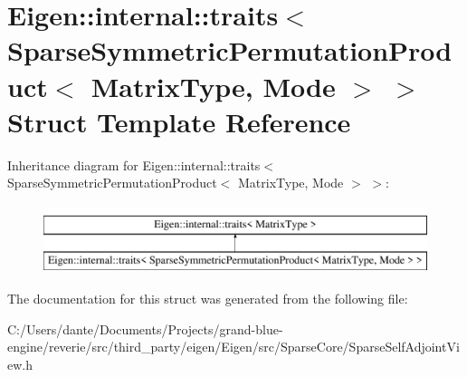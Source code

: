 \hypertarget{struct_eigen_1_1internal_1_1traits_3_01_sparse_symmetric_permutation_product_3_01_matrix_type_00_01_mode_01_4_01_4}{}\section{Eigen\+::internal\+::traits$<$ Sparse\+Symmetric\+Permutation\+Product$<$ Matrix\+Type, Mode $>$ $>$ Struct Template Reference}
\label{struct_eigen_1_1internal_1_1traits_3_01_sparse_symmetric_permutation_product_3_01_matrix_type_00_01_mode_01_4_01_4}
Inheritance diagram for Eigen\+::internal\+::traits$<$ Sparse\+Symmetric\+Permutation\+Product$<$ Matrix\+Type, Mode $>$ $>$\+:\begin{figure}[H]
\begin{center}
\leavevmode
\includegraphics[height=2.000000cm]{struct_eigen_1_1internal_1_1traits_3_01_sparse_symmetric_permutation_product_3_01_matrix_type_00_01_mode_01_4_01_4}
\end{center}
\end{figure}


The documentation for this struct was generated from the following file\+:\begin{DoxyCompactItemize}
\item 
C\+:/\+Users/dante/\+Documents/\+Projects/grand-\/blue-\/engine/reverie/src/third\+\_\+party/eigen/\+Eigen/src/\+Sparse\+Core/Sparse\+Self\+Adjoint\+View.\+h\end{DoxyCompactItemize}
